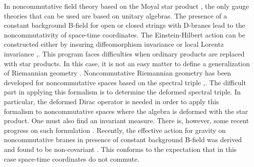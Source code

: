 \documentclass[a4paper,a4paper]{article}
\begin{document}
In noncommutative field theory based on the Moyal star product \cite{CDS},
\cite{SW} the only gauge theories that can be used are based on unitary
algebras. The presence of a constant background B-field for open or closed
strings with D-branes lead to the noncommutativity of space-time coordinates.
The Einstein-Hilbert action can be constructed either by insuring
diffeomorphism invariance or local Lorentz invariance \cite{Utiyama}%
,\cite{Kibble}. This program faces difficulties when ordinary products are
replaced with star products. In this case, it is not an easy matter to define
a generalization of Riemannian geometry . Noncommutative Riemannian geometry
has been developed for noncommutative spaces based on the spectral triple
\cite{CFF},\cite{Connes}. The difficult part in applying this formalism is to
determine the deformed spectral triple. In particular, the deformed Dirac
operator is needed in order to apply this formalism to noncommutative spaces
where the algebra is deformed with the star product. One must also find an
invariant measure. There is, however, some recent progress on such formulation
\cite{CD}. Recently, the effective action for gravity on noncommutative branes
in presence of constant background B-field was derived and found to be
non-covariant \cite{SL}. This conforms to the expectation that in this case
space-time coordinates do not commute.
\end{document}
